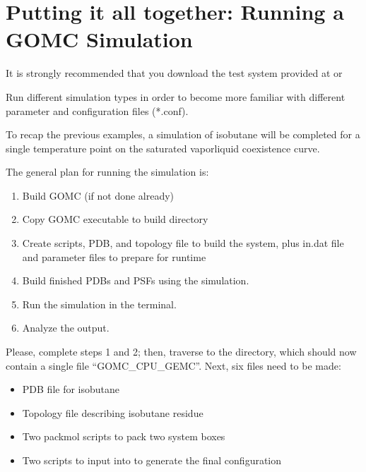 \documentclass[letterpaper,10pt,english]{sphinxmanual}
\begin{document}
\chapter{Putting it all together: Running a GOMC Simulation}
\label{\detokenize{putting_all_together:putting-it-all-together-running-a-gomc-simulation}}\label{\detokenize{putting_all_together::doc}}
It is strongly recommended that you download the test system provided at  or 

Run different simulation types in order to become more familiar with different parameter and configuration files (*.conf).

To recap the previous examples, a simulation of isobutane will be completed for a single temperature point on the saturated vapor\sphinxhyphen{}liquid coexistence curve.

The general plan for running the simulation is:
\begin{enumerate}
%
\item {} 
Build GOMC (if not done already)

\item {} 
Copy GOMC executable to build directory

\item {} 
Create scripts, PDB, and topology file to build the system, plus in.dat file and parameter files to prepare for runtime

\item {} 
Build finished PDBs and PSFs using the simulation.

\item {} 
Run the simulation in the terminal.

\item {} 
Analyze the output.

\end{enumerate}

Please, complete steps 1 and 2; then, traverse to the directory, which should now contain a single file “GOMC\_CPU\_GEMC”. Next, six files need to be made:
\begin{itemize}
\item {} 
PDB file for isobutane

\item {} 
Topology file describing isobutane residue

\item {} 
Two  packmol scripts to pack two system boxes

\item {} 
Two  scripts to input into  to generate the final configuration

\end{itemize}
\end{document}
